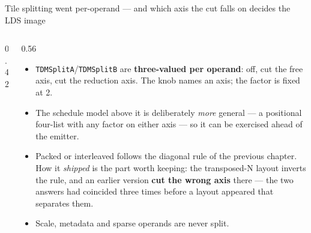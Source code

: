 \documentclass[aspectratio=169,9pt]{beamer}
\newcommand{\key}[1]{\textcolor{acc}{\textbf{#1}}}
\newcommand{\bad}[1]{\textcolor{warn}{\textbf{#1}}}
\begin{document}
\begin{frame}{Tile splitting went per-operand --- and which axis the cut falls on decides the LDS image}
\begin{columns}[T]
\begin{column}{0.42\textwidth}
\begin{center}
\end{center}
\end{column}
\begin{column}{0.56\textwidth}
\begin{itemize}
\item \texttt{TDMSplitA}/\texttt{TDMSplitB} are \key{three-valued per operand}: off, cut the free
      axis, cut the reduction axis. The knob names an axis; the factor is fixed at 2.
\item The schedule model above it is deliberately \emph{more} general --- a positional four-list
      with any factor on either axis --- so it can be exercised ahead of the emitter.
\item Packed or interleaved follows the diagonal rule of the previous chapter. How it \emph{shipped}
      is the part worth keeping: the transposed-N layout inverts the rule, and an earlier version
      \bad{cut the wrong axis} there --- the two answers had coincided three times before a layout
      appeared that separates them.
\item Scale, metadata and sparse operands are never split.
\end{itemize}
\end{column}
\end{columns}
\end{frame}
\end{document}
